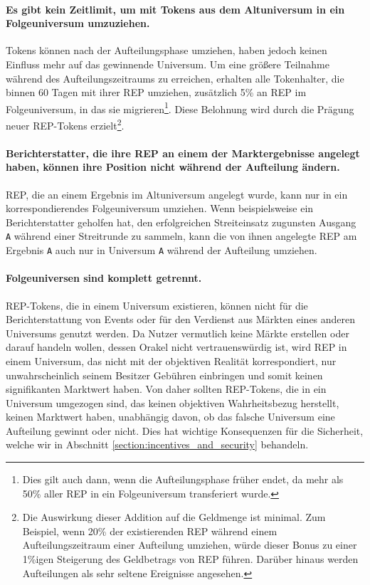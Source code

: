 \documentclass[floatfix,reprint,nofootinbib,amsmath,amssymb,epsfig,pre,floats,letterpaper,groupedaffiliation]{revtex4-1}
\theoremstyle{definition}
\theoremstyle{definition}
\theoremstyle{definition}
\begin{document}
\paragraph*{Es gibt kein Zeitlimit, um mit Tokens aus dem Altuniversum in ein Folgeuniversum umzuziehen.} Tokens können nach der Aufteilungsphase umziehen, haben jedoch keinen Einfluss mehr auf das gewinnende Universum. Um eine größere Teilnahme während des Aufteilungszeitraums zu erreichen, erhalten alle Tokenhalter, die binnen 60 Tagen mit ihrer REP umziehen, zusätzlich 5\% an REP im Folgeuniversum, in das sie migrieren\footnote{Dies gilt auch dann, wenn die Aufteilungsphase früher endet, da mehr als 50\% aller REP in ein Folgeuniversum transferiert wurde.}. Diese Belohnung wird durch die Prägung neuer REP-Tokens erzielt\footnote{Die Auswirkung dieser Addition auf die Geldmenge ist minimal. Zum Beispiel, wenn 20\% der existierenden REP während einem Aufteilungszeitraum einer Aufteilung umziehen, würde dieser Bonus zu einer 1\%igen Steigerung des Geldbetrags von REP führen. Darüber hinaus werden Aufteilungen als sehr seltene Ereignisse angesehen.}.

\paragraph*{Berichterstatter, die ihre REP an einem der Marktergebnisse angelegt haben, können ihre Position nicht während der Aufteilung ändern.} REP, die an einem Ergebnis im Altuniversum angelegt wurde, kann nur in ein korrespondierendes Folgeuniversum umziehen. Wenn beispielsweise ein Berichterstatter geholfen hat, den erfolgreichen Streiteinsatz zugunsten Ausgang \texttt{A} während einer Streitrunde zu sammeln, kann die von ihnen angelegte REP am Ergebnis \texttt{A} auch nur in Universum \texttt{A} während der Aufteilung umziehen.

\paragraph*{Folgeuniversen sind komplett getrennt.} REP-Tokens, die in einem Universum existieren, können nicht für die Berichterstattung von Events oder für den Verdienst aus Märkten eines anderen Universums genutzt werden. Da Nutzer vermutlich keine Märkte erstellen oder darauf handeln wollen, dessen Orakel nicht vertrauenswürdig ist, wird REP in einem Universum, das nicht mit der objektiven Realität korrespondiert, nur unwahrscheinlich seinem Besitzer Gebühren einbringen und somit keinen signifikanten Marktwert haben. Von daher sollten REP-Tokens, die in ein Universum umgezogen sind, das keinen objektiven Wahrheitsbezug herstellt, keinen Marktwert haben, unabhängig davon, ob das falsche Universum eine Aufteilung gewinnt oder nicht. Dies hat wichtige Konsequenzen für die Sicherheit, welche wir in Abschnitt \ref{section:incentives_and_security} behandeln.
\end{document}
